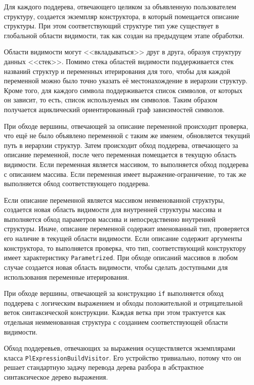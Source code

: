 \documentclass[times,specification,annotation]{style/itmo-student-thesis/itmo-student-thesis}
\begin{document}
Для каждого поддерева, отвечающего целиком за объявленную пользователем структуру, создается экземпляр конструктора, в который помещается описание структуры. При этом соответствующий структуре тип уже существует в глобальной области видимости, так как создан на предыдущем этапе обработки.

Области видимости могут <<вкладываться>> друг в друга, образуя структуру данных <<стек>>. Помимо стека областей видимости поддерживается стек названий структур и переменных итерирования для того, чтобы для каждой переменной можно было точно указать её местонахождение в иерархии структур. Кроме того, для каждого символа поддерживается список символов, от которых он зависит, то есть, список используемых им символов. Таким образом получается ациклический ориентированный граф зависимостей символов.

При обходе вершины, отвечающей за описание переменной происходит проверка, что ещё не было объявлено переменной с таким же именем, обновляется текущий путь в иерархии структур. Затем происходит обход поддерева, отвечающего за описание переменной, после чего переменная помещается в текущую область видимости. Если переменная является массивом, то выполняется обход поддерева с описанием массива. Если переменная имеет выражение-ограничение, то так же выполняется обход соответствующего поддерева.

Если описание переменной является массивом неименованной структуры, создается новая область видимости для внутренней структуры массива и выполняется обход параметров массива и непосредственно внутренней структуры. Иначе, описание переменной содержит именованный тип, проверяется его наличие в текущей области видимости. Если описание содержит аргументы конструктора, то выполняется проверка, что тип, соответствующий конструктору имеет характеристику \texttt{Parametrized}. При обходе описаний массивов в любом случае создается новая область видимости, чтобы сделать доступными для использования переменные итерирования.

При обходе вершины, отвечающей за конструкцию \texttt{if} выполняется обход поддерева с логическим выражением и обходы положительной и отрицательной веток синтаксической конструкции. Каждая ветка при этом трактуется как отдельная неименованная структура с созданием соответствующей области видимости.

Обход поддеревьев, отвечающих за выражения осуществляется экземплярами класса \texttt{PlExpressionBuildVisitor}. Его устройство тривиально, потому что он решает стандартную задачу перевода дерева разбора в абстрактное синтаксическое дерево выражения.
\end{document}

